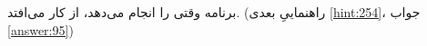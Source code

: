 \section{}
\paragraph{}\label{hint:182}
برنامه وقتی  را انجام می‌دهد، از کار می‌افتد. (راهنماییِ بعدی \ref{hint:254}، جواب \ref{answer:95})